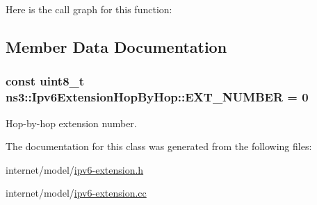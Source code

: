 Here is the call graph for this function\+:




\subsection{Member Data Documentation}
\subsubsection[{\texorpdfstring{E\+X\+T\+\_\+\+N\+U\+M\+B\+ER}{EXT_NUMBER}}]{\setlength{\rightskip}{0pt plus 5cm}const uint8\+\_\+t ns3\+::\+Ipv6\+Extension\+Hop\+By\+Hop\+::\+E\+X\+T\+\_\+\+N\+U\+M\+B\+ER = 0\hspace{0.3cm}{\ttfamily [static]}}\hypertarget{classns3_1_1Ipv6ExtensionHopByHop_adb791ca3225aba53dbd61f92cb99b946}{}\label{classns3_1_1Ipv6ExtensionHopByHop_adb791ca3225aba53dbd61f92cb99b946}


Hop-\/by-\/hop extension number. 



The documentation for this class was generated from the following files\+:\begin{DoxyCompactItemize}
\item 
internet/model/\hyperlink{ipv6-extension_8h}{ipv6-\/extension.\+h}\item 
internet/model/\hyperlink{ipv6-extension_8cc}{ipv6-\/extension.\+cc}\end{DoxyCompactItemize}
